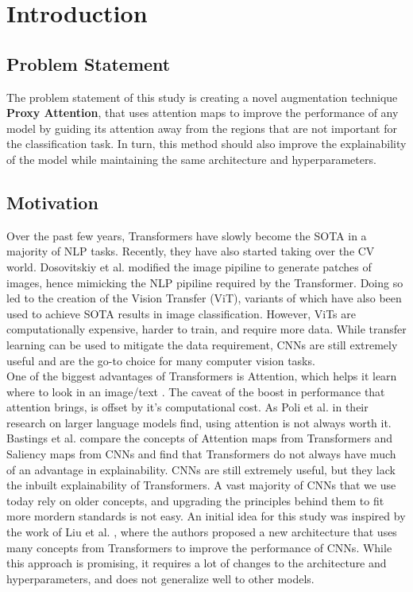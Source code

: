 
\chapter{Introduction}

\section{Problem Statement}
The problem statement of this study is creating a novel augmentation technique \textbf{Proxy Attention}, that uses attention maps to improve the performance of any model by guiding its attention away from the regions that are not important for the classification task.
In turn, this method should also improve the explainability of the model while maintaining the same architecture and hyperparameters.

\section{Motivation}
Over the past few years, Transformers have slowly become the SOTA in a majority of NLP tasks. Recently, they have also started taking over the CV world. Dosovitskiy et al. \cite{dosovitskiyImageWorth16x162021}  modified the image pipiline to generate patches of images, hence mimicking the NLP pipiline required by the Transformer. Doing so led to the creation of the Vision Transfer (ViT), variants of which have also been used to achieve SOTA results in image classification. However, ViTs are computationally expensive, harder to train, and require more data. While transfer learning can be used to mitigate the data requirement, CNNs are still extremely useful and are the go-to choice for many computer vision tasks.\\
One of the biggest advantages of Transformers is Attention, which helps it learn where to look in an image/text \cite{vaswaniAttentionAllYou2017}. The caveat of the boost in performance that attention brings, is offset by it's computational cost. As Poli et al. \cite{poliHyenaHierarchyLarger2023} in their research on larger language models find, using attention is not always worth it. Bastings et al. \cite{bastingsElephantInterpretabilityRoom2020} compare the concepts of Attention maps from Transformers and Saliency maps from CNNs and find that Transformers do not always have much of an advantage in explainability. CNNs are still extremely useful, but they lack the inbuilt explainability of Transformers. A vast majority of CNNs that we use today rely on older concepts, and upgrading the principles behind them to fit more mordern standards is not easy. An initial idea for this study was inspired by the work of Liu et al. \cite{liuConvNet2020s2022}, where the authors proposed a new architecture that uses many concepts from Transformers to improve the performance of CNNs. While this approach is promising, it requires a lot of changes to the architecture and hyperparameters, and does not generalize well to other models. \\\\
